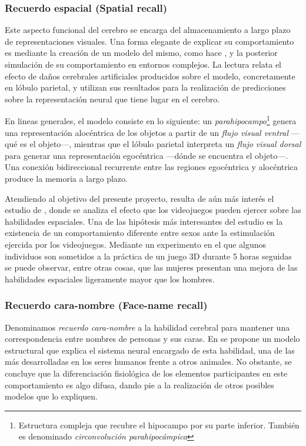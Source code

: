 \subsubsection{Recuerdo espacial (Spatial recall)}

Este aspecto funcional del cerebro se encarga del almacenamiento a largo plazo de representaciones visuales. Una forma elegante de explicar su comportamiento es mediante la creación de un modelo del mismo, como hace \cite{becker}, y la posterior simulación de su comportamiento en entornos complejos. La lectura relata el efecto de daños cerebrales artificiales producidos sobre el modelo, concretamente en lóbulo parietal, y utilizan sus resultados para la realización de predicciones sobre la representación neural que tiene lugar en el cerebro.

En lineas generales, el modelo consiste en lo siguiente: un {\it parahipocampo}\footnote{Estructura compleja que recubre el hipocampo por su parte inferior. También es denominado {\it circonvolución parahipocámpica}} genera una representación alocéntrica de los objetos a partir de un {\it flujo visual ventral} ---qué es el objeto---, mientras que el lóbulo parietal interpreta un {\it flujo visual dorsal} para generar una representación egocéntrica ---dónde se encuentra el objeto---. Una conexión bidireccional recurrente entre las regiones egocéntrica y alocéntrica produce la memoria a largo plazo.

Atendiendo al objetivo del presente proyecto, resulta de aún más interés el estudio de \cite{Hirvasoja2004}, donde se analiza el efecto que los videojuegos pueden ejercer sobre las habilidades espaciales. Una de las hipótesis más interesantes del estudio es la existencia de un comportamiento diferente entre sexos ante la estimulación ejercida por los videojuegos. Mediante un experimento en el que algunos individuos son sometidos a la práctica de un juego 3D durante 5 horas seguidas se puede observar, entre otras cosas, que las mujeres presentan una mejora de las habilidades espaciales ligeramente mayor que los hombres.

\subsubsection{Recuerdo cara-nombre (Face-name recall)}

Denominamos {\it recuerdo cara-nombre} a la habilidad cerebral para mantener una correspondencia entre nombres de personas y sus caras. En \cite{Haxby2000} se propone un modelo estructural que explica el sistema neural encargado de esta habilidad, una de las más desarrolladas en los seres humanos frente a otros animales. No obstante, se concluye que la diferenciación fisiológica de los elementos participantes en este comportamiento es algo difusa, dando pie a la realización de otros posibles modelos que lo expliquen.

